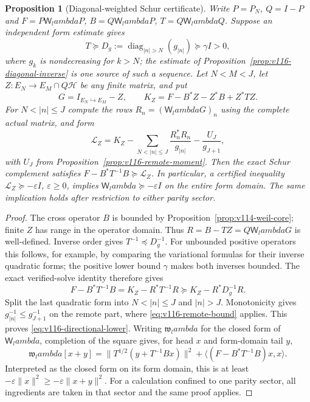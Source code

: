 \documentclass[11pt]{article}
\def\lambda{lambda}%
\newtheorem{proposition}[theorem]{Proposition}
\theoremstyle{remark}
\begin{document}
\begin{proposition}[Diagonal-weighted Schur certificate]
\label{prop:v116-directional-schur}
Write $P=P_N$, $Q=I-P$ and
$F=P\mathsf W_\lambda P$, $B=Q\mathsf W_\lambda P$,
$T=Q\mathsf W_\lambda Q$.  Suppose an independent form estimate gives
\[
 T\succeq D_g:=\operatorname{diag}_{|n|>N}(g_{|n|})
       \succeq\gamma I>0,
\]
where $g_k$ is nondecreasing for $k>N$; the estimate of
Proposition~\ref{prop:v116-diagonal-inverse} is one source of such a
sequence.  Let $N<M<J$, let $Z:E_N\to E_M\cap Q\mathcal H$ be any
finite matrix, and put
\[
 G=I_{E_N\hookrightarrow E_M}-Z,\qquad
 K_Z=F-B^*Z-Z^*B+Z^*TZ.
\]
For $N<|n|\le J$ compute the rows
$R_n=(\mathsf W_\lambda G)_n$ using the complete actual matrix,
and form
\begin{equation}\label{eq:v116-directional-lower}
 \mathcal L_Z=K_Z-
     \sum_{N<|n|\le J}\frac{R_n^*R_n}{g_{|n|}}
                    -\frac{U_J}{g_{J+1}},
\end{equation}
with $U_J$ from Proposition~\ref{prop:v116-remote-moment}.
Then the exact Schur complement satisfies
$F-B^*T^{-1}B\succeq\mathcal L_Z$.
In particular, a certified inequality
$\mathcal L_Z\succeq-\varepsilon I$, $\varepsilon\ge0$, implies
$\mathsf W_\lambda\succeq-\varepsilon I$ on the entire form domain.
The same implication holds after restriction to either parity sector.
\end{proposition}
\begin{proof}
The cross operator $B$ is bounded by
Proposition~\ref{prop:v114-weil-core}; finite $Z$ has range in the
operator domain.  Thus $R=B-TZ=Q\mathsf W_\lambda G$ is well-defined.
Inverse order gives $T^{-1}\preceq D_g^{-1}$.  For unbounded
positive operators this follows, for example, by comparing the
variational formulas for their inverse quadratic forms; the positive
lower bound $\gamma$ makes both inverses bounded.  The exact
verified-solve identity therefore gives
\[
 F-B^*T^{-1}B=K_Z-R^*T^{-1}R
                  \succeq K_Z-R^*D_g^{-1}R.
\]
Split the last quadratic form into $N<|n|\le J$ and $|n|>J$.
Monotonicity gives $g_{|n|}^{-1}\le g_{J+1}^{-1}$ on the remote part,
where \eqref{eq:v116-remote-bound} applies.  This proves
\eqref{eq:v116-directional-lower}.  Writing $\mathfrak w_\lambda$ for the closed form of
$\mathsf W_\lambda$, completion of the square gives, for head $x$
and form-domain tail $y$,
\[
 \mathfrak w_\lambda[x+y]
 =\|T^{1/2}(y+T^{-1}Bx)\|^2
       +\langle(F-B^*T^{-1}B)x,x\rangle.
\]
Interpreted as the closed form on its form domain, this is at least
$-\varepsilon\|x\|^2\ge-\varepsilon\|x+y\|^2$.
For a calculation confined to one parity sector, all ingredients
are taken in that sector and the same proof applies.
\end{proof}
\end{document}
